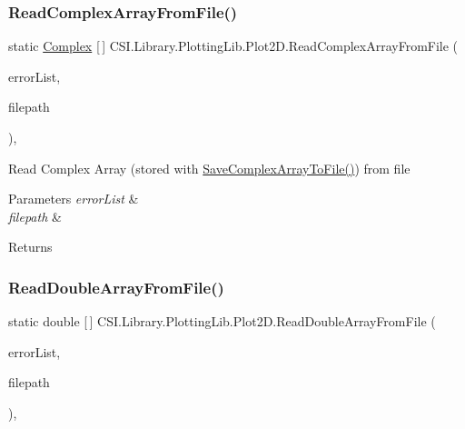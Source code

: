 \subsubsection{\texorpdfstring{ReadComplexArrayFromFile()}{ReadComplexArrayFromFile()}}
{\footnotesize\ttfamily static \mbox{\hyperlink{struct_c_s_i_1_1_library_1_1_data_types_1_1_complex}{Complex}} \mbox{[}$\,$\mbox{]} C\+S\+I.\+Library.\+Plotting\+Lib.\+Plot2\+D.\+Read\+Complex\+Array\+From\+File (\begin{DoxyParamCaption}\item[{\mbox{\hyperlink{class_c_s_i_1_1_library_1_1_errors_1_1_error_list}{Error\+List}}}]{error\+List,  }\item[{string}]{filepath }\end{DoxyParamCaption})\hspace{0.3cm}{\ttfamily [inline]}, {\ttfamily [static]}}



Read Complex Array (stored with \mbox{\hyperlink{class_c_s_i_1_1_library_1_1_plotting_lib_1_1_plot2_d_a0959acd193403a2feaaad7940884ad12}{Save\+Complex\+Array\+To\+File()}}) from file 


\begin{DoxyParams}{Parameters}
{\em error\+List} & \\
\hline
{\em filepath} & \\
\hline
\end{DoxyParams}
\begin{DoxyReturn}{Returns}

\end{DoxyReturn}
\mbox{\label{class_c_s_i_1_1_library_1_1_plotting_lib_1_1_plot2_d_a5384d3f88757fb6a8b297a894016609b}} 
\subsubsection{\texorpdfstring{ReadDoubleArrayFromFile()}{ReadDoubleArrayFromFile()}}
{\footnotesize\ttfamily static double \mbox{[}$\,$\mbox{]} C\+S\+I.\+Library.\+Plotting\+Lib.\+Plot2\+D.\+Read\+Double\+Array\+From\+File (\begin{DoxyParamCaption}\item[{\mbox{\hyperlink{class_c_s_i_1_1_library_1_1_errors_1_1_error_list}{Error\+List}}}]{error\+List,  }\item[{string}]{filepath }\end{DoxyParamCaption})\hspace{0.3cm}{\ttfamily [inline]}, {\ttfamily [static]}}



